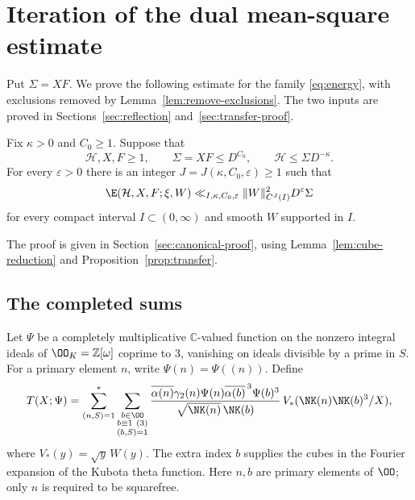 \section[Iteration of the dual mean-square estimate]{\texorpdfstring{Iteration of the dual mean-square estimate}{Iteration of the dual mean-square estimate}}\label{sec:descent}

Put $\Sigma=XF$. We prove the following estimate for the family
\eqref{eq:energy}, with exclusions removed by
Lemma~\ref{lem:remove-exclusions}. The two inputs are proved in
Sections~\ref{sec:reflection} and~\ref{sec:transfer-proof}.

\begin{proposition}\label{prop:canonical}
Fix $\kappa>0$ and $C_0\ge1$. Suppose that
\begin{equation}\label{eq:positive-gap}
 \mathcal H,X,F\ge1,\qquad
 \Sigma=XF\le D^{C_0},\qquad
 \mathcal H\le\Sigma D^{-\kappa}.
\end{equation}
For every $\varepsilon>0$ there is an integer
$J=J(\kappa,C_0,\varepsilon)\ge1$ such that
\begin{equation}\label{eq:canonical-bound}
 \E(\mathcal H,X,F;\xi,W)
 \ll_{I,\kappa,C_0,\varepsilon}
 \|W\|_{C^J(I)}^2D^\varepsilon\Sigma
\end{equation}
for every compact interval $I\subset(0,\infty)$ and smooth $W$ supported
in $I$.
\end{proposition}

The proof is given in Section~\ref{sec:canonical-proof}, using
Lemma~\ref{lem:cube-reduction} and Proposition~\ref{prop:transfer}.

\subsection{The completed sums}
Let $\Psi$ be a completely multiplicative $\mathbb C$-valued function on the
nonzero integral ideals of $\OO_K=\mathbb Z[\omega]$ coprime to $3$, vanishing on ideals divisible by a prime in $S$. 
For a primary element $n$, write $\Psi(n)=\Psi((n))$.
Define
\begin{equation}\label{eq:T}
 T(X;\Psi)=
 \sum_{(n,S)=1}^*\sum_{\substack{b\in\OO\\b\equiv1\ (3)\\(b,S)=1}}
 \frac{\overline{\alpha(n)}\gamma_2(n)\Psi(n)
       \overline{\alpha(b)}^{\,3}\Psi(b)^3}
      {\sqrt{\NK(n)}\,\NK(b)}\,V_*(\NK(n)\NK(b)^3/X),
\end{equation}
where $V_*(y)=\sqrt y\,W(y)$. The extra index $b$ supplies the cubes in the Fourier expansion of the
Kubota theta function.
Here $n,b$ are primary elements of $\OO$; only $n$ is required to be
squarefree.

